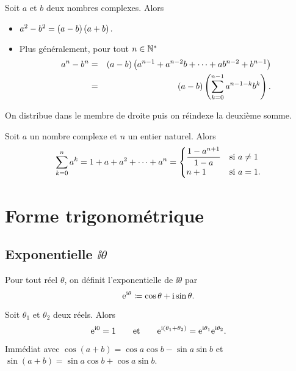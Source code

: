 \documentclass{magnolia}
\begin{document}
\begin{proposition}[utile=-3]
  Soit $a$ et $b$ deux nombres complexes. Alors
  \begin{itemize}
  \item $a^2-b^2=\left(a-b\right)\left(a+b\right).$
  \item Plus généralement, pour tout $n\in{\mathbb{N}^*}$
    \begin{eqnarray*}
  a^n-b^n
  &=& \left(a-b\right)\left(a^{n-1}+a^{n-2}b+\dots+
      ab^{n-2}+b^{n-1}\right)\\
  &=& \left(a-b\right)\left(\sum_{k=0}^{n-1} a^{n-1-k}b^k\right).
  \end{eqnarray*}
  \end{itemize}
\end{proposition}

\begin{preuve}
On distribue dans le membre de droite puis on réindexe la deuxième somme.
\end{preuve}

\begin{proposition}[utile=-3]
Soit $a$ un nombre complexe et $n$ un entier naturel. Alors
\[\sum_{k=0}^n a^k=1+a+a^2+\cdots+a^n=
  \begin{cases}
  \displaystyle\frac{1-a^{n+1}}{1-a} & \text{si $a\neq 1$}\\
  n+1                  & \text{si $a=1$.}
  \end{cases}\]
\end{proposition}

\section{Forme trigonométrique}

\subsection{Exponentielle $\ii\theta$}

\begin{definition}[utile=-3]
Pour tout réel $\theta$, on définit l'exponentielle de $\ii\theta$ par
\[{\rm e}^{{\rm i}\theta}\coloneqq\cos\theta+{\rm i}\sin\theta.\]
\end{definition}

\begin{proposition}[utile=-3]
Soit $\theta_1$ et $\theta_2$ deux réels. Alors
\[{\rm e}^{{\rm i} 0}=1 \qquad\text{et}\qquad {\rm e}^{{\rm i}\left(\theta_1+\theta_2\right)}={\rm e}^{{\rm i}\theta_1}{\rm e}^{{\rm i}\theta_2}.\]
\end{proposition}

\begin{preuve}
Immédiat avec $\cos(a+b)=\cos a\cos b-\sin a\sin b$ et $\sin(a+b)=\sin a\cos b+\cos a\sin b$.
\end{preuve}
\end{document}
